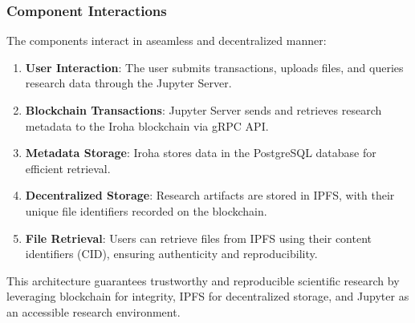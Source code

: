 \documentclass{article}
\begin{document}
\subsubsection{Component Interactions}
The components interact in aseamless and decentralized manner:
\begin{enumerate}
      \item \textbf{User Interaction}: The user submits transactions, uploads files, and queries research data through the Jupyter Server.
      \item \textbf{Blockchain Transactions}: Jupyter Server sends and retrieves research metadata to the Iroha blockchain via gRPC API.
      \item \textbf{Metadata Storage}: Iroha stores data in the PostgreSQL database for efficient retrieval.
      \item \textbf{Decentralized Storage}: Research artifacts are stored in IPFS, with their unique file identifiers recorded on the blockchain.
      \item \textbf{File Retrieval}: Users can retrieve files from IPFS using their content identifiers (CID), ensuring authenticity and reproducibility.
\end{enumerate}

This architecture guarantees trustworthy and reproducible scientific research by leveraging blockchain for integrity, IPFS for decentralized storage, and Jupyter as an accessible research environment.
\end{document}
